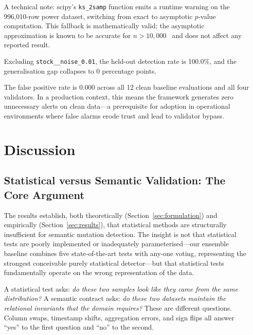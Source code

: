 \documentclass[journal]{IEEEtran}
\newcommand{\mut}[1]{\mbox{\texttt{#1}}}
\begin{document}
A technical note: scipy's \texttt{ks\_2samp} function emits 
a runtime warning on the 996{,}010-row power dataset, switching 
from exact to asymptotic $p$-value computation. This fallback 
is mathematically valid; the asymptotic approximation is known 
to be accurate for $n > 10{,}000$~\cite{kolmogorov1933} and 
does not affect any reported result.

Excluding \mut{stock\_\_noise\_0.01}, the held-out detection rate is
100.0\%, and the generalisation gap collapses to 0 percentage points.

The false positive rate is 0.000 across all 12 clean baseline evaluations
and all four validators.  In a production context, this means the framework
generates zero unnecessary alerts on clean data---a prerequisite for
adoption in operational environments where false alarms erode trust and
lead to validator bypass.

\section{Discussion}
\label{sec:discussion}

\subsection{Statistical versus Semantic Validation: The Core Argument}

The results establish, both theoretically (Section~\ref{sec:formulation})
and empirically (Section~\ref{sec:results}), that statistical methods are
structurally insufficient for semantic mutation detection.  The insight is
not that statistical tests are poorly implemented or inadequately
parameterised---our ensemble baseline combines five state-of-the-art tests
with any-one voting, representing the strongest conceivable purely
statistical detector---but that statistical tests fundamentally operate on
the wrong representation of the data.

A statistical test asks: \emph{do these two samples look like they came
from the same distribution?}  A semantic contract asks: \emph{do these two
datasets maintain the relational invariants that the domain requires?}
These are different questions.  Column swaps, timestamp shifts, aggregation
errors, and sign flips all answer ``yes'' to the first question and ``no''
to the second.
\end{document}
